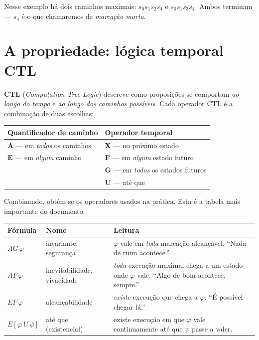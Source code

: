 \documentclass[11pt,a4paper]{report}
\begin{document}
Nesse exemplo há dois caminhos maximais: $s_0 s_1 s_2 s_4$ e $s_0 s_1 s_3 s_4$.
Ambos terminam --- $s_4$ é o que chamaremos de \emph{marcação morta}.

\section{A propriedade: lógica temporal CTL}

\textbf{CTL} (\emph{Computation Tree Logic}) descreve como proposições se
comportam \emph{ao longo do tempo} e \emph{ao longo dos caminhos possíveis}.
Cada operador CTL é a combinação de duas escolhas:

\begin{center}
\begin{tabular}{@{}ll@{}}
\toprule
\textbf{Quantificador de caminho} & \textbf{Operador temporal} \\
\midrule
\textbf{A} --- em \emph{todos} os caminhos & \textbf{X} --- no próximo estado \\
\textbf{E} --- em \emph{algum} caminho     & \textbf{F} --- em \emph{algum} estado futuro \\
                                            & \textbf{G} --- em \emph{todos} os estados futuros \\
                                            & \textbf{U} --- até que \\
\bottomrule
\end{tabular}
\end{center}

Combinando, obtêm-se os operadores usados na prática. Esta é a tabela mais
importante do documento:

\begin{center}
\begin{tabular}{@{}llp{7.6cm}@{}}
\toprule
\textbf{Fórmula} & \textbf{Nome} & \textbf{Leitura} \\
\midrule
$AG\,\varphi$ & invariante, segurança
  & $\varphi$ vale em \emph{toda} marcação alcançável. ``Nada de ruim acontece.'' \\[4pt]
$AF\,\varphi$ & inevitabilidade, vivacidade
  & \emph{toda} execução maximal chega a um estado onde $\varphi$ vale. ``Algo de bom acontece, sempre.'' \\[4pt]
$EF\,\varphi$ & alcançabilidade
  & \emph{existe} execução que chega a $\varphi$. ``É possível chegar lá.'' \\[4pt]
$E[\varphi\ U\ \psi]$ & até que (existencial)
  & existe execução em que $\varphi$ vale continuamente até que $\psi$ passe a valer. \\
\bottomrule
\end{tabular}
\end{center}
\end{document}
